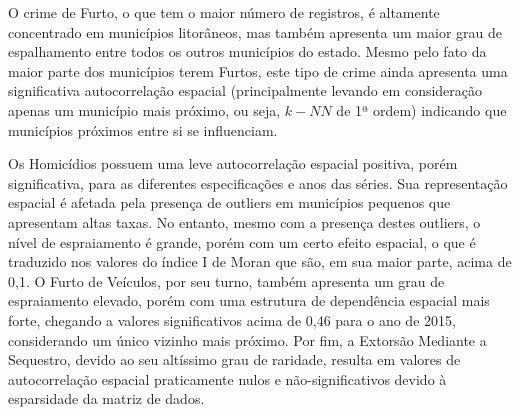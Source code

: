 \documentclass[12pt,openright,oneside,a4paper,english,french,spanish]{abntex2}
\numberwithin{table}{section} %
\numberwithin{figure}{section} %
\begin{document}
O crime de Furto, o que tem o maior número de registros, é altamente concentrado em municípios litorâneos, mas também apresenta um maior grau de espalhamento entre todos os outros municípios do estado. Mesmo pelo fato da maior parte dos municípios terem Furtos, este tipo de crime ainda apresenta uma significativa autocorrelação espacial (principalmente levando em consideração apenas um município mais próximo, ou seja, $k-NN$ de 1ª ordem) indicando que municípios próximos entre si se influenciam. 

Os Homicídios possuem uma leve autocorrelação espacial positiva, porém significativa, para as diferentes especificações e anos das séries. Sua representação espacial é afetada pela presença de outliers em municípios pequenos que apresentam altas taxas. No entanto, mesmo com a presença destes outliers, o nível de espraiamento é grande, porém com um certo efeito espacial, o que é traduzido nos valores do índice I de Moran que são, em sua maior parte, acima de 0,1. O Furto de Veículos, por seu turno, também apresenta um grau de espraiamento elevado, porém com uma estrutura de dependência espacial mais forte, chegando a valores significativos acima de 0,46 para o ano de 2015, considerando um único vizinho mais próximo. Por fim, a Extorsão Mediante a Sequestro, devido ao seu altíssimo grau de raridade, resulta em valores de autocorrelação espacial praticamente nulos e não-significativos devido à esparsidade da matriz de dados. 
\end{document}
